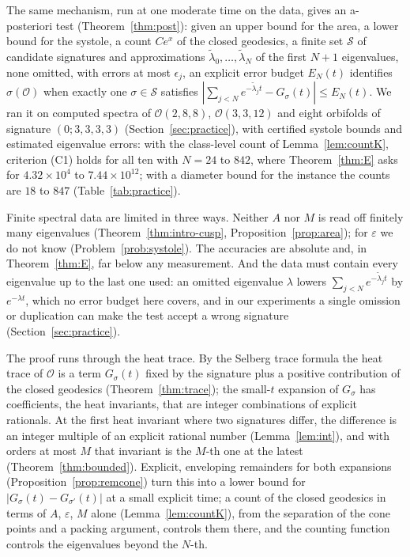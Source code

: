 \documentclass[pdflatex,sn-mathphys-num]{sn-jnl}
\theoremstyle{thmstyleone}%
\theoremstyle{thmstylethree}%
\newcommand{\Orb}{\mathcal{O}}
\begin{document}
The same mechanism, run at one moderate time on the data, gives an a-posteriori test (Theorem~\ref{thm:post}): given an upper bound for the area, a lower bound for the systole, a count $Ce^x$ of the closed geodesics, a finite set $\mathcal S$ of candidate signatures and approximations $\tilde\lambda_0,\dots,\tilde\lambda_N$ of the first $N+1$ eigenvalues, none omitted, with errors at most $\epsilon_j$, an explicit error budget $E_N(t)$ identifies $\sigma(\Orb)$ when exactly one $\sigma\in\mathcal S$ satisfies $|\sum_{j<N}e^{-\tilde\lambda_jt}-G_\sigma(t)|\le E_N(t)$. We ran it on computed spectra of $\Orb(2,8,8)$, $\Orb(3,3,12)$ and eight orbifolds of signature $(0;3,3,3,3)$ (Section~\ref{sec:practice}), with certified systole bounds and estimated eigenvalue errors: with the class-level count of Lemma~\ref{lem:countK}, criterion (C1) holds for all ten with $N=24$ to $842$, where Theorem~\ref{thm:E} asks for $4.32\times10^4$ to $7.44\times10^{12}$; with a diameter bound for the instance the counts are $18$ to $847$ (Table~\ref{tab:practice}).


Finite spectral data are limited in three ways. Neither $A$ nor $M$ is read off finitely many eigenvalues (Theorem~\ref{thm:intro-cusp}, Proposition~\ref{prop:area}); for $\varepsilon$ we do not know (Problem~\ref{prob:systole}). The accuracies are absolute and, in Theorem~\ref{thm:E}, far below any measurement. And the data must contain every eigenvalue up to the last one used: an omitted eigenvalue $\lambda$ lowers $\sum_{j<N}e^{-\tilde\lambda_jt}$ by $e^{-\lambda t}$, which no error budget here covers, and in our experiments a single omission or duplication can make the test accept a wrong signature (Section~\ref{sec:practice}).

The proof runs through the heat trace. By the Selberg trace formula the heat trace of $\Orb$ is a term $G_\sigma(t)$ fixed by the signature plus a positive contribution of the closed geodesics (Theorem~\ref{thm:trace}); the small-$t$ expansion of $G_\sigma$ has coefficients, the heat invariants, that are integer combinations of explicit rationals. At the first heat invariant where two signatures differ, the difference is an integer multiple of an explicit rational number (Lemma~\ref{lem:int}), and with orders at most $M$ that invariant is the $M$-th one at the latest (Theorem~\ref{thm:bounded}). Explicit, enveloping remainders for both expansions (Proposition~\ref{prop:remcone}) turn this into a lower bound for $|G_\sigma(t)-G_{\sigma'}(t)|$ at a small explicit time; a count of the closed geodesics in terms of $A$, $\varepsilon$, $M$ alone (Lemma~\ref{lem:countK}), from the separation of the cone points and a packing argument, controls them there, and the counting function controls the eigenvalues beyond the $N$-th.
\end{document}
